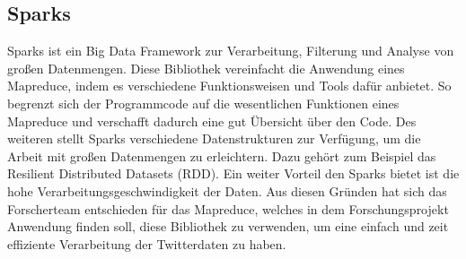 	
	\subsection{Sparks}
	
	Sparks ist ein Big Data Framework zur Verarbeitung, Filterung und Analyse von großen Datenmengen. Diese Bibliothek vereinfacht die Anwendung eines 
	Mapreduce, indem es verschiedene Funktionsweisen und Tools dafür anbietet. So begrenzt sich der Programmcode auf die wesentlichen Funktionen eines 
	Mapreduce und verschafft dadurch eine gut Übersicht über den Code. Des weiteren stellt Sparks verschiedene Datenstrukturen zur Verfügung, um die Arbeit mit 
	großen Datenmengen zu erleichtern. Dazu gehört zum Beispiel das Resilient Distributed Datasets (RDD). Ein weiter Vorteil den Sparks bietet ist die hohe 
	Verarbeitungsgeschwindigkeit der Daten.
	Aus diesen Gründen hat sich das Forscherteam entschieden für das Mapreduce, welches in dem Forschungsprojekt Anwendung finden soll, diese Bibliothek zu 
	verwenden, um eine einfach und zeit effiziente Verarbeitung der Twitterdaten zu haben.
	    
	

	
